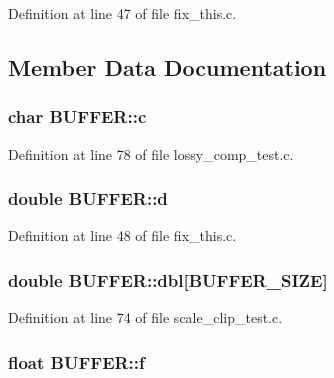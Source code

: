 Definition at line 47 of file fix\+\_\+this.\+c.



\subsection{Member Data Documentation}
\subsubsection[{\texorpdfstring{c}{c}}]{\setlength{\rightskip}{0pt plus 5cm}char B\+U\+F\+F\+E\+R\+::c}\hypertarget{union_b_u_f_f_e_r_a34898ba11954dc86ce7cd826fe110fd7}{}\label{union_b_u_f_f_e_r_a34898ba11954dc86ce7cd826fe110fd7}


Definition at line 78 of file lossy\+\_\+comp\+\_\+test.\+c.

\subsubsection[{\texorpdfstring{d}{d}}]{\setlength{\rightskip}{0pt plus 5cm}double B\+U\+F\+F\+E\+R\+::d}\hypertarget{union_b_u_f_f_e_r_a0883f3ab62eb854ba89f76146ca79910}{}\label{union_b_u_f_f_e_r_a0883f3ab62eb854ba89f76146ca79910}


Definition at line 48 of file fix\+\_\+this.\+c.

\subsubsection[{\texorpdfstring{dbl}{dbl}}]{\setlength{\rightskip}{0pt plus 5cm}double B\+U\+F\+F\+E\+R\+::dbl\mbox{[}{\bf B\+U\+F\+F\+E\+R\+\_\+\+S\+I\+ZE}\mbox{]}}\hypertarget{union_b_u_f_f_e_r_ae3629fe0ac01dbeb28795ccba76f8356}{}\label{union_b_u_f_f_e_r_ae3629fe0ac01dbeb28795ccba76f8356}


Definition at line 74 of file scale\+\_\+clip\+\_\+test.\+c.

\subsubsection[{\texorpdfstring{f}{f}}]{\setlength{\rightskip}{0pt plus 5cm}float B\+U\+F\+F\+E\+R\+::f}\hypertarget{union_b_u_f_f_e_r_aa33765505130ffb63893c570f0018838}{}\label{union_b_u_f_f_e_r_aa33765505130ffb63893c570f0018838}



